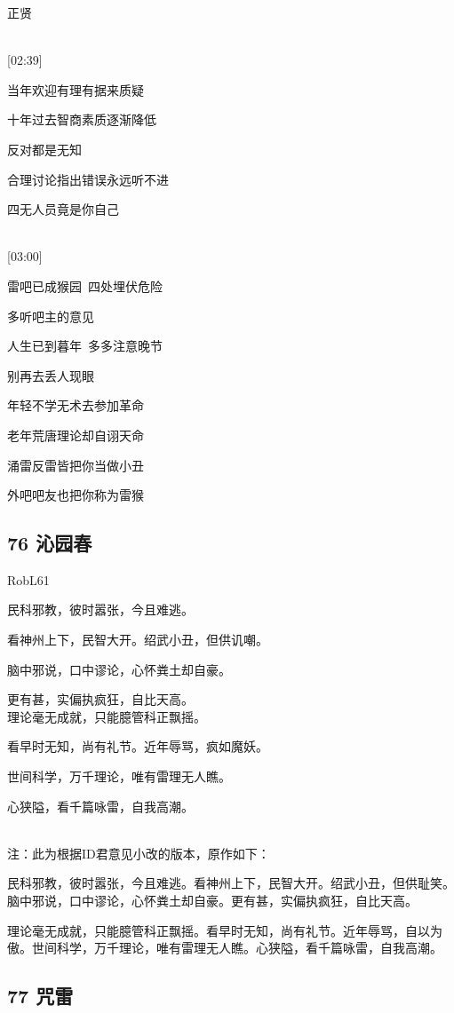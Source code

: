 正贤

~\\
{[}02:39{]}

当年欢迎有理有据来质疑

十年过去智商素质逐渐降低

反对都是无知

合理讨论指出错误永远听不进

四无人员竟是你自己

~\\
{[}03:00{]}

雷吧已成猴园~四处埋伏危险

多听吧主的意见

人生已到暮年~多多注意晚节

别再去丢人现眼

年轻不学无术去参加革命

老年荒唐理论却自诩天命

涌雷反雷皆把你当做小丑

外吧吧友也把你称为雷猴

\hypertarget{ux6c81ux56edux6625-1}{%
\subsection{76 沁园春}\label{ux6c81ux56edux6625-1}}

{RobL61}

民科邪教，彼时嚣张，今且难逃。

看神州上下，民智大开。绍武小丑，但供讥嘲。

脑中邪说，口中谬论，心怀粪土却自豪。

更有甚，实偏执疯狂，自比天高。 ~\\
理论毫无成就，只能臆管科正飘摇。

看早时无知，尚有礼节。近年辱骂，疯如魔妖。

世间科学，万千理论，唯有雷理无人瞧。

心狭隘，看千篇咏雷，自我高潮。

~\\
注：此为根据ID君意见小改的版本，原作如下：

民科邪教，彼时嚣张，今且难逃。看神州上下，民智大开。绍武小丑，但供耻笑。脑中邪说，口中谬论，心怀粪土却自豪。更有甚，实偏执疯狂，自比天高。

理论毫无成就，只能臆管科正飘摇。看早时无知，尚有礼节。近年辱骂，自以为傲。世间科学，万千理论，唯有雷理无人瞧。心狭隘，看千篇咏雷，自我高潮。

\hypertarget{ux5492ux96f7}{%
\subsection{77 咒雷}\label{ux5492ux96f7}}

